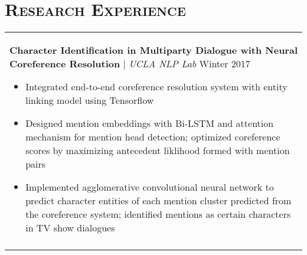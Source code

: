 \documentclass[letterpaper,11pt]{article} %
\begin{document}
{%

\section{\Large\bf\textsc{Research Experience}}
\begin{tabular}{p{18.5cm}}


{\bf{Character Identification in Multiparty Dialogue with Neural Coreference Resolution}} | {\it{UCLA NLP Lab}} \hfill Winter 2017
\begin{itemize}
\item Integrated end-to-end coreference resolution system with entity linking model using Tensorflow 
\item Designed mention embeddings with Bi-LSTM and attention mechanism for mention head detection; optimized coreference scores by maximizing antecedent liklihood formed with mention pairs
\item Implemented agglomerative convolutional neural network to predict character entities of each mention cluster predicted from the coreference system; identified mentions as certain characters in TV show dialogues\vspace*{-\baselineskip}
\end{itemize} \\
\vspace{.1mm}


\end{tabular}}
\end{document}

